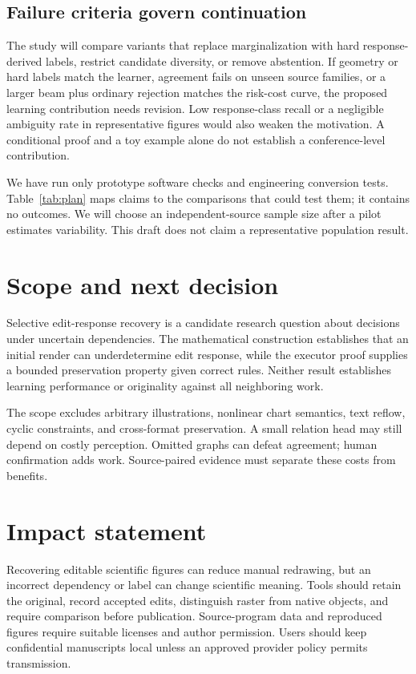 \documentclass{article}
\begin{document}
\subsection{Failure criteria govern continuation}
The study will compare variants that replace marginalization with hard response-derived labels, restrict candidate diversity, or remove abstention. If geometry or hard labels match the learner, agreement fails on unseen source families, or a larger beam plus ordinary rejection matches the risk-cost curve, the proposed learning contribution needs revision. Low response-class recall or a negligible ambiguity rate in representative figures would also weaken the motivation. A conditional proof and a toy example alone do not establish a conference-level contribution.

We have run only prototype software checks and engineering conversion tests. Table~\ref{tab:plan} maps claims to the comparisons that could test them; it contains no outcomes. We will choose an independent-source sample size after a pilot estimates variability. This draft does not claim a representative population result.

\section{Scope and next decision}
Selective edit-response recovery is a candidate research question about decisions under uncertain dependencies. The mathematical construction establishes that an initial render can underdetermine edit response, while the executor proof supplies a bounded preservation property given correct rules. Neither result establishes learning performance or originality against all neighboring work.

The scope excludes arbitrary illustrations, nonlinear chart semantics, text reflow, cyclic constraints, and cross-format preservation. A small relation head may still depend on costly perception. Omitted graphs can defeat agreement; human confirmation adds work. Source-paired evidence must separate these costs from benefits.

\section*{Impact statement}
Recovering editable scientific figures can reduce manual redrawing, but an incorrect dependency or label can change scientific meaning. Tools should retain the original, record accepted edits, distinguish raster from native objects, and require comparison before publication. Source-program data and reproduced figures require suitable licenses and author permission. Users should keep confidential manuscripts local unless an approved provider policy permits transmission.

\begingroup
\small
\balance


\endgroup
\end{document}
